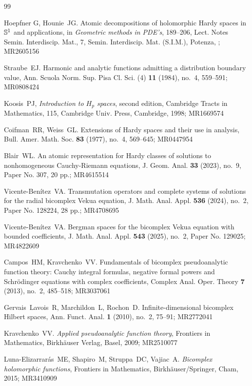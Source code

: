 \documentclass[suppldata]{interact}
\theoremstyle{plain}%
\theoremstyle{definition}
\theoremstyle{remark}
\begin{document}
\begin{thebibliography}{99}

Hoepfner G, Hounie~JG. Atomic decompositions of holomorphic Hardy spaces in $\Bbb S^1$ and applications, in {\it Geometric methods in PDE's}, 189--206, Lect. Notes Semin. Interdiscip. Mat., 7, Semin. Interdiscip. Mat. (S.I.M.), Potenza, ; MR2605156

Straube~EJ. Harmonic and analytic functions admitting a distribution boundary value, Ann. Scuola Norm. Sup. Pisa Cl. Sci. (4) {\bf 11} (1984), no.~4, 559--591; MR0808424

Koosis~PJ, {\it Introduction to $H_p$ spaces}, second edition, 
Cambridge Tracts in Mathematics, 115, Cambridge Univ. Press, Cambridge, 1998; MR1669574

Coifman~RR, Weiss~GL. Extensions of Hardy spaces and their use in analysis, Bull. Amer. Math. Soc. {\bf 83} (1977), no.~4, 569--645; MR0447954

Blair~WL. An atomic representation for Hardy classes of solutions to nonhomogeneous Cauchy-Riemann equations, J. Geom. Anal. {\bf 33} (2023), no.~9, Paper No. 307, 20 pp.; MR4615514

Vicente-Ben\'itez~VA. Transmutation operators and complete systems of solutions for the radial bicomplex Vekua equation, J. Math. Anal. Appl. {\bf 536} (2024), no.~2, Paper No. 128224, 28 pp.; MR4708695

Vicente-Ben\'itez~VA. Bergman spaces for the bicomplex Vekua equation with bounded coefficients, J. Math. Anal. Appl. {\bf 543} (2025), no.~2, Paper No. 129025; MR4822609

Campos~HM, Kravchenko~VV. Fundamentals of bicomplex pseudoanalytic function theory: Cauchy integral formulas, negative formal powers and Schr\"odinger equations with complex coefficients, Complex Anal. Oper. Theory {\bf 7} (2013), no.~2, 485--518; MR3037061

Gervais~Lavois~R, Marchildon~L, Rochon~D. Infinite-dimensional bicomplex Hilbert spaces, Ann. Funct. Anal. {\bf 1} (2010), no.~2, 75--91; MR2772041

Kravchenko~VV. {\it Applied pseudoanalytic function theory}, Frontiers in Mathematics, Birkh\"auser Verlag, Basel, 2009; MR2510077

Luna-Elizarrar\'as~ME, Shapiro~M, Struppa~DC, Vajiac~A. {\it Bicomplex holomorphic functions}, Frontiers in Mathematics, Birkh\"auser/Springer, Cham, 2015; MR3410909


\end{thebibliography}
\end{document}
